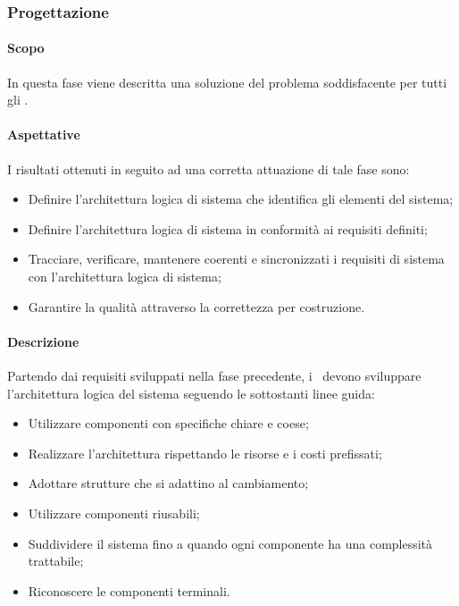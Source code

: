 \documentclass[../NormeDiProgetto.tex]{subfiles}
\begin{document}
		\subsubsection{Progettazione}
			\paragraph{Scopo\\}
				In questa fase viene descritta una soluzione del problema soddisfacente per tutti
				gli .
			\paragraph{Aspettative\\}
				I risultati ottenuti in seguito ad una corretta attuazione di tale fase sono:
				\begin{itemize}
					\item Definire l'architettura logica di sistema che identifica gli elementi
					del sistema;
					\item Definire l'architettura logica di sistema in conformità ai requisiti
					definiti;
					\item Tracciare, verificare, mantenere coerenti e sincronizzati i requisiti di sistema con
					l'architettura logica di sistema;
					\item Garantire la qualità attraverso la correttezza per costruzione.
				\end{itemize}
			\paragraph{Descrizione\\}
				Partendo dai requisiti sviluppati nella fase precedente, i \progettisti\ devono
				sviluppare l'architettura logica del sistema seguendo le sottostanti linee guida:
				\begin{itemize}
					\item Utilizzare componenti con specifiche chiare e coese;
					\item Realizzare l'architettura rispettando le risorse e i costi prefissati;
					\item Adottare strutture che si adattino al cambiamento;
					\item Utilizzare componenti riusabili;
					\item Suddividere il sistema fino a quando ogni componente ha una
					complessità trattabile;
					\item Riconoscere le componenti terminali.
				\end{itemize}
			
\end{document}
